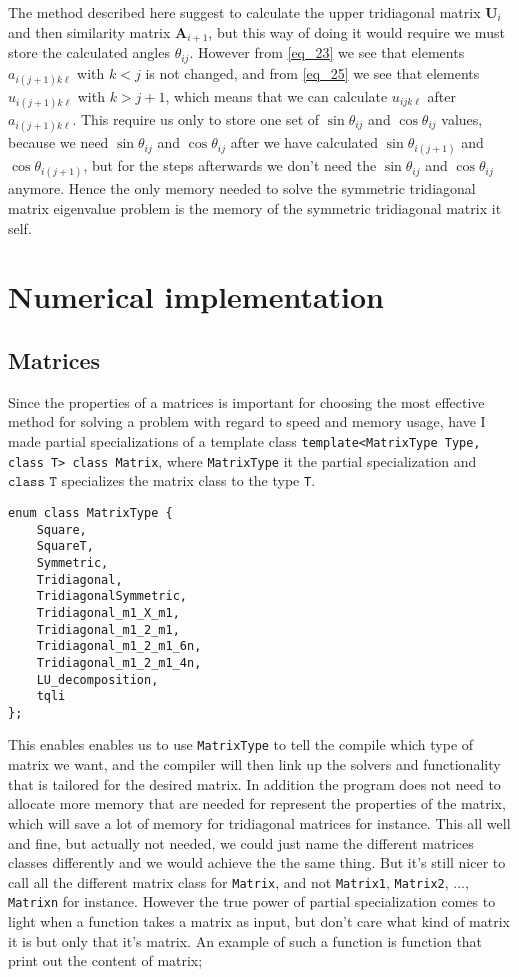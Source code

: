 \documentclass[11pt,english,a4paper]{article}
\begin{document}
\begin{flushleft}
The method described here suggest to calculate the upper tridiagonal matrix $\textbf{U}_i$ and then similarity matrix $\textbf{A}_{i+1}$, but this way of doing it would require we must store the calculated angles $\theta_{ij}$. However from \eqref{eq_23} we see  that elements $a_{i(j+1)k\ell}$ with $k < j$ is not changed, and from \eqref{eq_25} we see that elements $u_{i(j+1)k\ell}$ with $k >j+1$, which means that we can calculate $u_{ijk\ell}$ after $a_{i(j+1)k\ell}$. This require us only to store one set of $\sin\theta_{ij}$ and $\cos\theta_{ij}$ values, because we need $\sin\theta_{ij}$ and $\cos\theta_{ij}$ after we have calculated $\sin\theta_{i(j+1)}$ and $\cos\theta_{i(j+1)}$, but for the steps afterwards we don't need the $\sin\theta_{ij}$ and $\cos\theta_{ij}$ anymore. Hence the only memory needed to solve the symmetric tridiagonal matrix eigenvalue problem is the memory of the symmetric tridiagonal matrix it self.

\section{Numerical implementation}

\subsection{Matrices}

Since the properties of a matrices is important for choosing the most effective method for solving a problem with regard to speed and memory usage, have I made partial specializations of a template class \texttt{template<MatrixType Type, class T> class Matrix}, where \texttt{MatrixType} it the partial specialization and $\texttt{class T}$ specializes the matrix class to the type \texttt{T}.

\begin{lstlisting}[title={Matrix partial specialization}]
enum class MatrixType {
    Square,
    SquareT,
    Symmetric,
    Tridiagonal,
    TridiagonalSymmetric,
    Tridiagonal_m1_X_m1,
    Tridiagonal_m1_2_m1,
    Tridiagonal_m1_2_m1_6n,
    Tridiagonal_m1_2_m1_4n,
    LU_decomposition,
    tqli
};
\end{lstlisting}

This enables enables us to use \texttt{MatrixType} to tell the compile which type of matrix we want, and the compiler will then link up the solvers and functionality that is tailored for the desired matrix. In addition the program does not need to allocate more memory that are needed for represent the properties of the matrix, which will save a lot of memory for tridiagonal matrices for instance. This all well and fine, but actually not needed, we could just name the different matrices classes differently and we would achieve the the same thing. But it's still nicer to call all the different matrix class for \texttt{Matrix}, and not \texttt{Matrix1}, \texttt{Matrix2}, ..., \texttt{Matrixn} for instance. However the true power of partial specialization comes to light when a function takes a matrix as input, but don't care what kind of matrix it is but only that it's matrix. An example of such a function is function that print out the content of matrix;


\end{flushleft}
\end{document}

